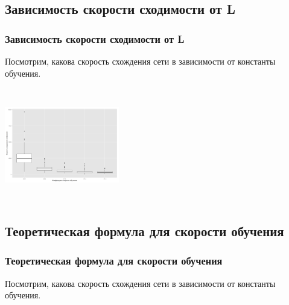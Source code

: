 \documentclass{beamer}
\begin{document}
\subsection{Зависимость скорости сходимости от L}
\begin{frame}
\frametitle{Зависимость скорости сходимости от L}
Посмотрим, какова скорость схождения сети в зависимости от константы обучения.

\begin{center}
\includegraphics[width=5cm, height=5cm]{../../plots/eta_vs_speed.png}

\end{center}
\end{frame}

\subsection{Теоретическая формула для скорости обучения}
\begin{frame}
\frametitle{Теоретическая формула для скорости обучения}
Посмотрим, какова скорость схождения сети в зависимости от константы обучения.

\end{frame}
\end{document}

